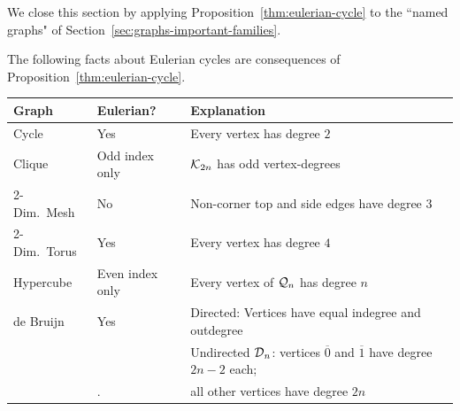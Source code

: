 \bigskip

We close this section by applying Proposition~\ref{thm:eulerian-cycle}
to the ``named graphs" of Section~\ref{sec:graphs-important-families}.

\medskip

\begin{corol}
\label{corol:eulerian-named-graphs}
The following facts about Eulerian cycles are consequences of Proposition~\ref{thm:eulerian-cycle}.

{\small
\begin{tabular}{|l|l|l|}
\hline
Graph & Eulerian? & Explanation \\
\hline \hline
Cycle                          & Yes                          & Every vertex has degree $2$ \\
\hline
Clique                         & Odd index only       & $\mbox{$\cal K$}_{2n}$ has odd vertex-degrees \\
\hline
2-Dim.~Mesh  & No                           & Non-corner top and side edges have degree $3$ \\  
\hline                     
2-Dim.~Torus  & Yes                          & Every vertex has degree $4$ \\
\hline
Hypercube                  & Even index only & Every vertex of $\mbox{$\cal Q$}_n$ has degree $n$ \\
\hline
de Bruijn                     & Yes  & Directed: Vertices have equal {\sc indegree} and {\sc outdegree} \\
                                   &         & Undirected $\mbox{$\cal D$}_n$: vertices $\overline{0}$ and $\overline{1}$ have
                                                  degree $2n-2$ each; \\
                                    &.       & \hspace*{.77in}all other vertices have degree $2n$ \\
\hline
\end{tabular}
}
\end{corol}


